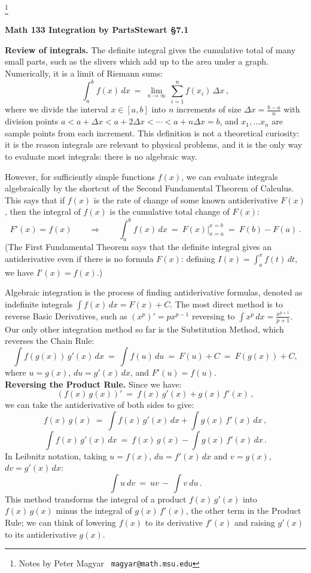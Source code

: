 \documentclass[11pt]{article}
\begin{document}
\footnote[0]{Notes by Peter Magyar \ {\tt magyar@math.msu.edu}}
\vspace{-1em}

\centerline{\bf Math 133\hspace{1.5em} \hfill{\Large\bf
Integration by Parts}\hfill Stewart \S7.1}
\vspace{1em}

\noindent 
{\bf Review of integrals.}
The definite integral gives the cumulative total of many small parts, such as the slivers which add up to the area under a graph. Numerically, it is a limit of Riemann sums:
$$
\int_a^b\! f(x)\,dx \ =\
\lim_{n\to\infty}\,\sum_{i=1}^n f(x_i)\,\Delta x\,,
$$
where we divide the interval $x\in[a,b]$ into $n$ increments
of size $\Delta x=\frac{b-a}{n}$ with division points
$a<a{+}\Delta x<a{+}2\Delta x<\cdots < a{+}n\Delta x=b$, and $x_1,\ldots x_n$ are sample points from each increment.
This definition is not a theoretical curiosity: it is the reason integrals are relevant to physical problems, and it is the only way to evaluate most integrals: there is no algebraic way.

However, for sufficiently simple functions $f(x)$, we can evaluate integrals algebraically by the shortcut of the Second Fundamental Theorem of Calculus. 
This says that if $f(x)$ is the rate of change of some known antiderivative $F(x)$, then the integral of $f(x)$ is the cumulative total change of $F(x)$:
$$
F'(x)=f(x) 
\qquad\Longrightarrow\qquad 
\int_a^b f(x)\,dx \ =\ \left.F(x)\right|_{x=a}^{x=b}
\ =\ 
F(b)-F(a)\,.
$$
(The First Fundamental Theorem says that the definite integral gives an antiderivative even if there is no formula $F(x)$:
defining $I(x)= \int_a^x f(t)\,dt$, we have $I'(x)  = f(x)$.)

Algebraic integration is the process of finding antiderivative formulas, 
denoted as indefinite integrals $\int\! f(x)\,dx=F(x)+C$. 
The most direct method is to reverse Basic Derivatives, 
such as $(x^p)' = px^{p-1}$ reversing to $\int\! x^p\,dx =\frac{x^{p+1}}{p+1}$. 
Our only other integration method so far is the Substitution Method, 
which reverses the Chain Rule:
$$
\int\! f(g(x))\,g'(x)\,dx 
\ =\
\int\! f(u)\,du
\ =\ F(u) +C
\ =\ F(g(x)) + C,
$$
where $u=g(x)$, $du=g'(x)\,dx$, and $F'(u)=f(u)$.
\\[.5em]
{\bf Reversing the Product Rule.} Since we have:
$$
(f(x)\,g(x))' \ =\ 
f(x)\, g'(x) + g(x)\, f'(x)\,,
$$
we can take the antiderivative of both sides to give:
$$
f(x)\,g(x) \ =\ 
\int\! f(x)\,g'(x)\,dx + \int\! g(x)\,f'(x)\,dx\,,
$$
$$
\int\! f(x)\,g'(x)\,dx \ =\ f(x)\,g(x) - \int\! g(x)\,f'(x)\,dx\,.
$$
In Leibnitz notation, taking $u=f(x)$, $du=f'(x)\,dx$
and $v=g(x)$, $dv = g'(x)\,dx$:
$$
\int\! u\ dv \ =\ uv \,-\, \int\! v\ du\,.
$$
This method transforms the integral of a product $f(x)\,g'(x)$
into $f(x) \,g(x)$ minus the integral of $g(x)\,f'(x)$, the other term in the Product Rule; we can 
think of lowering $f(x)$ to its derivative $f'(x)$ and raising $g'(x)$ to its antiderivative $g(x)$.
\end{document}
